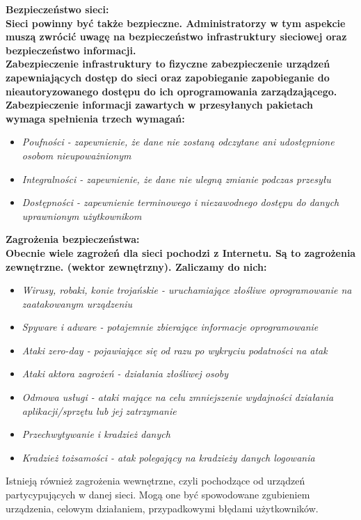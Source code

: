 \documentclass[a4paper,12pt]{article}
\newcommand{\h}[1]{\noindent \bf #1 \rm \\ \noindent}
\newcommand{\italic}[1]{\it #1 \rm}
\begin{document}
\h{Bezpieczeństwo sieci:}
Sieci powinny być także bezpieczne. Administratorzy w tym aspekcie muszą zwrócić uwagę na bezpieczeństwo infrastruktury sieciowej oraz bezpieczeństwo informacji.\\

\noindent
Zabezpieczenie infrastruktury to fizyczne zabezpieczenie urządzeń zapewniających dostęp do sieci oraz zapobieganie zapobieganie do nieautoryzowanego dostępu do ich oprogramowania zarządzającego.\\

\noindent
Zabezpieczenie informacji zawartych w przesyłanych pakietach wymaga spełnienia trzech wymagań:
\begin{itemize}
	\item \italic{Poufności} - zapewnienie, że dane nie zostaną odczytane ani udostępnione osobom nieupoważnionym
	\item \italic{Integralności} - zapewnienie, że dane nie ulegną zmianie podczas przesyłu
	\item \italic{Dostępności} - zapewnienie terminowego i niezawodnego dostępu do danych uprawnionym użytkownikom
\end{itemize}
\vspace{5mm}

\h{Zagrożenia bezpieczeństwa:}
Obecnie wiele zagrożeń dla sieci pochodzi  z Internetu. Są to zagrożenia zewnętrzne. (wektor zewnętrzny). Zaliczamy do nich:
\begin{itemize}
	\item \italic{Wirusy, robaki, konie trojańskie} - uruchamiające złośliwe oprogramowanie na zaatakowanym urządzeniu
	\item \italic{Spyware i adware} - potajemnie zbierające informacje oprogramowanie
	\item \italic{Ataki zero-day} - pojawiające się od razu po wykryciu podatności na atak
	\item \italic{Ataki aktora zagrożeń} - działania złośliwej osoby
	\item \italic{Odmowa usługi} - ataki mające na celu zmniejszenie wydajności działania aplikacji/sprzętu lub jej zatrzymanie
	\item \italic{Przechwytywanie i kradzież danych}
	\item \italic{Kradzież tożsamości} - atak polegający na kradzieży danych logowania
\end{itemize}
\vspace{5mm}

\noindent
Istnieją również zagrożenia wewnętrzne, czyli pochodzące od urządzeń partycypujących w danej sieci. Mogą one być spowodowane zgubieniem urządzenia, celowym działaniem, przypadkowymi błędami użytkowników.\\
\end{document}
